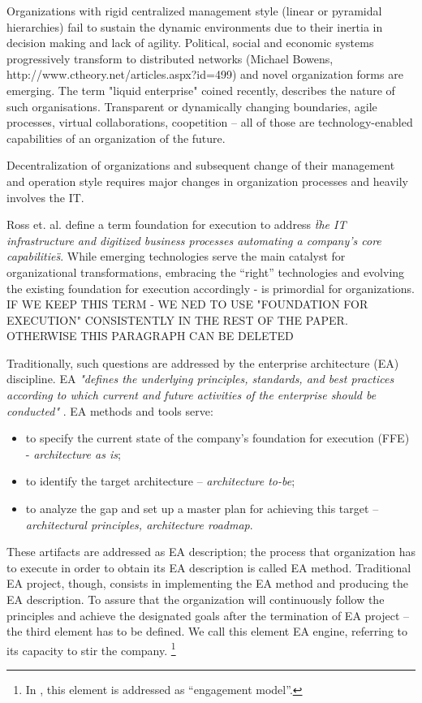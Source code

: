Organizations with rigid centralized management style (linear or pyramidal hierarchies) fail to sustain the dynamic environments due to their inertia in decision making and lack of agility. Political, social and economic systems progressively transform to distributed networks (Michael Bowens, http://www.ctheory.net/articles.aspx?id=499) and novel organization forms are emerging. 
The term "liquid enterprise" coined recently, describes the nature of such organisations. Transparent or dynamically changing boundaries, agile processes\cite{agileproc}, virtual collaborations, coopetition \cite{coopetition} – all of those are technology-enabled capabilities of an organization of the future. 

Decentralization of organizations and subsequent change of their management and operation style requires major changes in organization processes and heavily involves  the IT. 

Ross et. al. \cite{ross2006} define a term foundation for execution to address \textit{\"the IT infrastructure and digitized business processes automating a company’s core capabilities\"}. While emerging technologies serve the main catalyst for organizational transformations, embracing the “right” technologies and evolving the existing foundation for execution accordingly - is primordial for organizations.  IF WE KEEP THIS TERM - WE NED TO USE  "FOUNDATION FOR EXECUTION" CONSISTENTLY IN THE REST OF THE PAPER. OTHERWISE THIS PARAGRAPH CAN BE DELETED

Traditionally, such questions are addressed by the enterprise architecture (EA) discipline. 
EA \textit{"defines the underlying principles, standards, and best practices according to which current and future activities of the enterprise should be conducted"} \cite{schekkerman2003}. EA methods and tools serve:
\begin{itemize}
\item to specify the current state of the company's foundation for execution (FFE)  - \textit{architecture as is};
\item to identify the target architecture – \textit{architecture to-be};
\item to analyze the gap and set up a master plan for achieving this target – \textit{architectural principles, architecture roadmap}.
\end{itemize}
These artifacts are addressed as EA description; the process that organization has to execute in order to obtain its EA description is called EA method. Traditional EA project, though, consists in implementing the EA method and producing the EA description. To assure that the organization will continuously follow the principles and achieve the designated goals after the termination of EA project – the third element has to be defined. We call this element EA engine, referring to its capacity to stir the company. \footnote{In \cite{ross2006}, this element is addressed as “engagement model”.}

